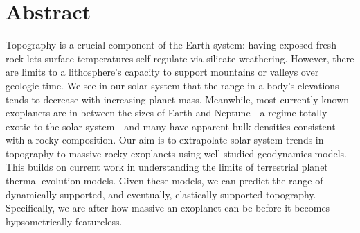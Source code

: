\section*{Abstract}

Topography is a crucial component of the Earth system: having exposed fresh rock lets surface temperatures self-regulate via silicate weathering. However, there are limits to a lithosphere’s capacity to support mountains or valleys over geologic time. We see in our solar system that the range in a body’s elevations tends to decrease with increasing planet mass. Meanwhile, most currently-known exoplanets are in between the sizes of Earth and Neptune---a regime totally exotic to the solar system---and many have apparent bulk densities consistent with a rocky composition. Our aim is to extrapolate solar system trends in topography to massive rocky exoplanets using well-studied geodynamics models. This builds on current work in understanding the limits of terrestrial planet thermal evolution models. Given these models, we can predict the range of dynamically-supported, and eventually, elastically-supported topography. Specifically, we are after how massive an exoplanet can be before it becomes hypsometrically featureless.